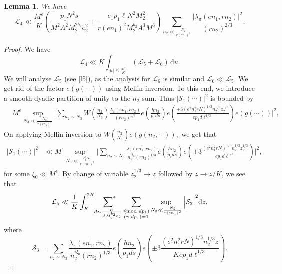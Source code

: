 \documentclass[12pt,a4paper,twoside, reqno]{amsart}
\newcommand{\shortmod}{\ensuremath{\negthickspace \negthickspace \negthickspace \pmod}}
\newcommand{\sumstar}{\sideset{}{^*}\sum}
\newtheorem{lemma}{Lemma}
\begin{document}
\begin{lemma}\label{l4 large sieve}
    We have 
    \[\mathcal{L}_4 \ll \frac{M^\epsilon}{K}  \left(  \frac{p_1N^2s}{M^2 A^2M_2^{2b_2}e_2^2}+  \frac{ e_1  p_1 \ell^{} N^2M_2^{2}} { r(en_1)^{2} M_2^{b_2}A^3 M^3 {}} {  }{ }  \right) \sum_{n_2 \ll   \frac{ N_2}{r (en_1)^2}}     \frac{ {|\lambda_\pi(en_1,rn_2)|^2}}{  {(rn_2)^{2/3}}  }. \]
\end{lemma}
\begin{proof}
We have 
\[   \mathcal{L}_4 \ll K \int_{|u| \leq \frac{M^\epsilon}{K}}(\mathcal{L}_5 +\mathcal{L}_6  ) \, \mathrm{d}u.\]
We will  analyse  $ \mathcal{L}_5$ (see \eqref{l5}), as the  analysis for   $ \mathcal{L}_6$   is similar and $\mathcal{L}_6 \ll  \mathcal{L}_5$. We   get rid of the factor $e(g(\cdots))$ using  Mellin inversion. To this end, we introduce a smooth dyadic partition of unity to the $n_2$-sum. Thus $ | \mathcal{S}_1(\cdots)|^2$ is bounded by 
\begin{align*}
   & M^\epsilon \sup_{N_3 \ll \frac{N_2}{r (en_1)^2}} 
       \Big| \sum_{n_2 \sim N_3} W(\frac{n_2}{N_3})  \frac{\overline{\lambda_\pi(en_1,rn_2)}}{ {(rn_2)^{1/3}}  }  e\left( \frac{hn_2}{p_1ds}\right) e\left( \frac{ \pm 3(e^2n_1^2r N)^{1/3}n_2^{1/3}z_2^{1/3} }{  ep_1d \ell^{{1/3}}}\right) e(g(\cdots))  \Big|^2,
\end{align*}
 On applying Mellin inversion  to 
   $  W(\frac{n_2}{N_3}) e(g(n_2,\cdots)), $    we get that 
\begin{align*}
     | \mathcal{S}_1(\cdots)|^2 &\ll M^\epsilon \sup_{N_3 \ll \frac{e_1^3N_2}{r (en_1)^2}}  \Big| \sum_{n_2 \sim N_3} \frac{\overline{\lambda_\pi(en_1,rn_2)}}{n_2^{i \xi_0}  {(rn_2)^{1/3}}  }  e\left( \frac{hn_2}{p_1ds}\right) e\left(\pm 3 \frac{(e^2n_1^2r N)^{1/3}n_2^{1/3}z_2^{1/3} }{  ep_1d \ell^{{1/3}}}\right)  \Big|^2,
\end{align*}
 for some $\xi_0 \ll M^{\epsilon}$. By   change of variable $z_2^{1/3} \rightarrow z$ followed by $z \rightarrow z/K$,
we see that 
\begin{align*}
     \mathcal{L}_5 \ll \frac{1}{K} \int_K^{2K}\mathop{\sumstar_{ \substack{d \sim \frac{C}{A M_2^{b_2} e_2}
       } } }\sum_{\substack{ \gamma \shortmod{dp_1} \\ (\gamma, dp_1)=1 }   }  \sup_{N_3 \ll \frac{ N_2}{r (en_1)^2}}  \Big| \mathcal{S}_3  \Big|^2 \mathrm{d}z ,
\end{align*}
where 
\[ \mathcal{S}_3= \sum_{n_2 \sim N_3} \frac{\overline{\lambda_\pi(en_1,rn_2)}}{n_2^{i \xi_0}  {(rn_2)^{1/3}}  }  e\left( \frac{hn_2}{p_1ds}\right) e\left(\pm 3 \frac{(e^2n_1^2r N)^{1/3}n_2^{1/3}z^{} }{ K ep_1d \ell^{{1/3}}}\right).\]

\end{proof}
\end{document}
